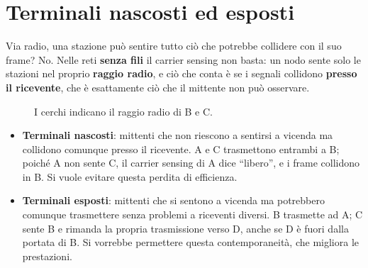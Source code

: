 \section{Terminali nascosti ed esposti}

Via radio, una stazione può sentire tutto ciò che potrebbe collidere con il suo frame? No. Nelle reti \textbf{senza fili} il carrier
sensing non basta: un nodo sente solo le stazioni nel proprio \textbf{raggio radio}, e ciò che conta è se i segnali collidono
\textbf{presso il ricevente}, che è esattamente ciò che il mittente non può osservare.

\begin{figure}[H]
\centering
{}
\caption{I cerchi indicano il raggio radio di B e C.}
\end{figure}

\begin{itemize}
    \item \textbf{Terminali nascosti}: mittenti che non riescono a sentirsi a vicenda ma collidono comunque presso il ricevente. A e C trasmettono
          entrambi a B; poiché A non sente C, il carrier sensing di A dice ``libero'', e i frame collidono in B. Si vuole evitare questa perdita di efficienza.
    \item \textbf{Terminali esposti}: mittenti che si sentono a vicenda ma potrebbero comunque trasmettere senza problemi a riceventi diversi. B
          trasmette ad A; C sente B e rimanda la propria trasmissione verso D, anche se D è fuori dalla portata di B. Si vorrebbe permettere questa
          contemporaneità, che migliora le prestazioni.
\end{itemize}


